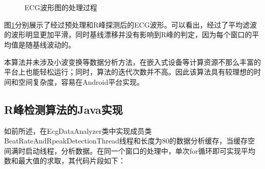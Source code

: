 \begin{figure}[htb]
  \centering
  \\
  \\
    \caption{ECG波形图的处理过程}
  \label{fig4-1} %
\end{figure}

图\ref{fig4-1}分别展示了经过预处理和R峰探测后的ECG波形。可以看出，经过了平均滤波的波形明显更加平滑，同时基线漂移并没有影响到R峰的判定，因为每个窗口的平均值是随基线波动的。

本算法并未涉及小波变换等数据分析方法，在嵌入式设备等计算资源不那么丰富的平台上也能轻松运行；同时，算法的迭代次数并不高。因此该算法具有较理想的时间和空间复杂度，容易在Android平台实现。

\subsection{R峰检测算法的Java实现}
如前所述，在EcgDataAnalyzer类中实现成员类BeatRateAndRpeakDetectionThread线程和长度为80的数据分析缓存，当缓存空间满时启动线程，分析数据。在同一个窗口的处理中，单次for循环即可实现平均数和最大值的求取，其代码片段如下：

